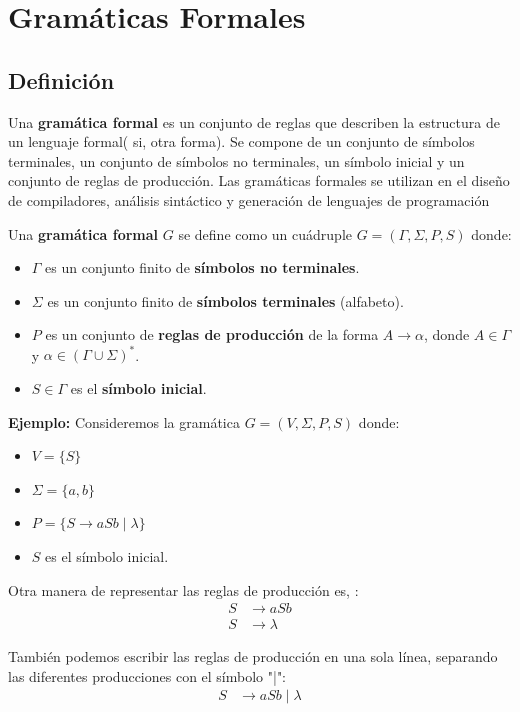 \section{Gramáticas Formales}

\subsection{Definición}
Una \textbf{gramática formal} es un conjunto de reglas que describen la estructura de un lenguaje formal( si, otra forma). 
Se compone de un conjunto de símbolos terminales, un conjunto de símbolos no terminales, un símbolo inicial y un conjunto de reglas de producción. 
Las gramáticas formales se utilizan en el diseño de compiladores, análisis sintáctico y generación de lenguajes de programación

\begin{Def}
    Una \textbf{gramática formal} $G$ se define como un cuádruple $G = (\Gamma, \Sigma, P, S)$ donde:
    \begin{itemize}
        \item $\Gamma$ es un conjunto finito de \textbf{símbolos no terminales}.
        \item $\Sigma$ es un conjunto finito de \textbf{símbolos terminales} (alfabeto).
        \item $P$ es un conjunto de \textbf{reglas de producción} de la forma $A \rightarrow \alpha$, donde $A \in \Gamma$ y $\alpha \in (\Gamma \cup \Sigma)^*$.
        \item $S \in \Gamma$ es el \textbf{símbolo inicial}.
    \end{itemize}
\end{Def}

\textbf{Ejemplo:} Consideremos la gramática $G = (V, \Sigma, P, S)$ donde:
\begin{itemize}
    \item $V = \{S\}$
    \item $\Sigma = \{a, b\}$
    \item $P = \{S \rightarrow aSb \mid \lambda\}$
    \item $S$ es el símbolo inicial.
\end{itemize}

Otra manera de representar las reglas de producción es, :
\begin{align*}
    S &\rightarrow aSb \\
    S &\rightarrow \lambda
\end{align*}

También podemos escribir las reglas de producción en una sola línea, separando las diferentes producciones con el símbolo "|":
\begin{align*}
    S &\rightarrow aSb \mid \lambda
\end{align*}

